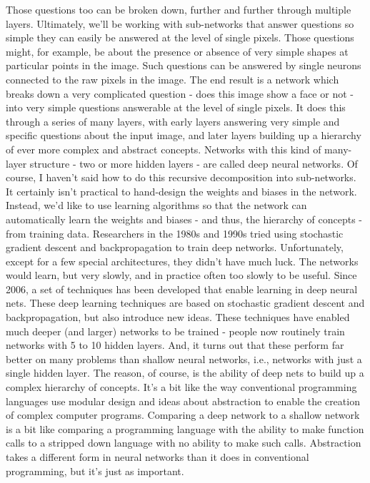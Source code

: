 Those questions too can be broken down, further and further through multiple layers. Ultimately, we'll be working with sub-networks that answer questions so simple they can easily be answered at the level of single pixels. Those questions might, for example, be about the presence or absence of very simple shapes at particular points in the image. Such questions can be answered by single neurons connected to the raw pixels in the image.
The end result is a network which breaks down a very complicated question - does this image show a face or not - into very simple questions answerable at the level of single pixels. It does this through a series of many layers, with early layers answering very simple and specific questions about the input image, and later layers building up a hierarchy of ever more complex and abstract concepts. Networks with this kind of many-layer structure - two or more hidden layers - are called deep neural networks.
Of course, I haven't said how to do this recursive decomposition into sub-networks. It certainly isn't practical to hand-design the weights and biases in the network. Instead, we'd like to use learning algorithms so that the network can automatically learn the weights and biases - and thus, the hierarchy of concepts - from training data. Researchers in the 1980s and 1990s tried using stochastic gradient descent and backpropagation to train deep networks. Unfortunately, except for a few special architectures, they didn't have much luck. The networks would learn, but very slowly, and in practice often too slowly to be useful.
Since 2006, a set of techniques has been developed that enable learning in deep neural nets. These deep learning techniques are based on stochastic gradient descent and backpropagation, but also introduce new ideas. These techniques have enabled much deeper (and larger) networks to be trained - people now routinely train networks with 5 to 10 hidden layers. And, it turns out that these perform far better on many problems than shallow neural networks, i.e., networks with just a single hidden layer. The reason, of course, is the ability of deep nets to build up a complex hierarchy of concepts. It's a bit like the way conventional programming languages use modular design and ideas about abstraction to enable the creation of complex computer programs. Comparing a deep network to a shallow network is a bit like comparing a programming language with the ability to make function calls to a stripped down language with no ability to make such calls. Abstraction takes a different form in neural networks than it does in conventional programming, but it's just as important.












